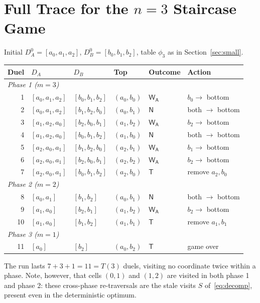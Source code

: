\documentclass[11pt]{article}
\theoremstyle{definition}
\theoremstyle{remark}
\newcommand{\WA}{\mathsf{W_A}}
\newcommand{\TT}{\mathsf{T}}
\newcommand{\NN}{\mathsf{N}}
\begin{document}
\section{Full Trace for the $n = 3$ Staircase Game}\label{app:trace}
Initial $D^0_A = [a_0, a_1, a_2]$, $D^0_B = [b_0, b_1, b_2]$, table $\phi_3$ as in Section~\ref{sec:small}.
\begin{center}
\footnotesize
\begin{tabular}{rlllll}
\toprule
Duel & $D_A$ & $D_B$ & Top & Outcome & Action\\
\midrule
\multicolumn{6}{l}{\emph{Phase 1 ($m = 3$)}}\\
1 & $[a_0,a_1,a_2]$ & $[b_0,b_1,b_2]$ & $(a_0,b_0)$ & $\WA$ & $b_0 \to$ bottom\\
2 & $[a_0,a_1,a_2]$ & $[b_1,b_2,b_0]$ & $(a_0,b_1)$ & $\NN$ & both $\to$ bottom\\
3 & $[a_1,a_2,a_0]$ & $[b_2,b_0,b_1]$ & $(a_1,b_2)$ & $\WA$ & $b_2 \to$ bottom\\
4 & $[a_1,a_2,a_0]$ & $[b_0,b_1,b_2]$ & $(a_1,b_0)$ & $\NN$ & both $\to$ bottom\\
5 & $[a_2,a_0,a_1]$ & $[b_1,b_2,b_0]$ & $(a_2,b_1)$ & $\WA$ & $b_1 \to$ bottom\\
6 & $[a_2,a_0,a_1]$ & $[b_2,b_0,b_1]$ & $(a_2,b_2)$ & $\WA$ & $b_2 \to$ bottom\\
7 & $[a_2,a_0,a_1]$ & $[b_0,b_1,b_2]$ & $(a_2,b_0)$ & $\TT$ & remove $a_2,b_0$\\
\multicolumn{6}{l}{\emph{Phase 2 ($m = 2$)}}\\
8 & $[a_0,a_1]$ & $[b_1,b_2]$ & $(a_0,b_1)$ & $\NN$ & both $\to$ bottom\\
9 & $[a_1,a_0]$ & $[b_2,b_1]$ & $(a_1,b_2)$ & $\WA$ & $b_2 \to$ bottom\\
10 & $[a_1,a_0]$ & $[b_1,b_2]$ & $(a_1,b_1)$ & $\TT$ & remove $a_1,b_1$\\
\multicolumn{6}{l}{\emph{Phase 3 ($m = 1$)}}\\
11 & $[a_0]$ & $[b_2]$ & $(a_0,b_2)$ & $\TT$ & game over\\
\bottomrule
\end{tabular}
\end{center}
The run lasts $7 + 3 + 1 = 11 = T(3)$ duels, visiting no coordinate twice within a phase. Note, however, that cells
$(0, 1)$ and $(1, 2)$ are visited in both phase 1 and phase 2: these cross-phase re-traversals are the stale visits $S$
of~\eqref{eq:decomp}, present even in the deterministic optimum.
\end{document}
